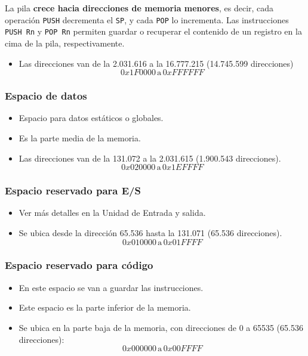 \documentclass{article}
\begin{document}
La pila \textbf{crece hacia direcciones de memoria menores}, es decir, cada operación \texttt{PUSH} decrementa el \texttt{SP}, y cada \texttt{POP} lo incrementa. Las instrucciones \texttt{PUSH Rn} y \texttt{POP Rn} permiten guardar o recuperar el contenido de un registro en la cima de la pila, respectivamente.

\begin{itemize}
  \item Las direcciones van de la 2.031.616 a la 16.777.215 (14.745.599 direcciones)
        \[
          0x1F0000 \, \text{a} \, 0xFFFFFF
        \]
\end{itemize}

\subsubsection{Espacio de datos}

\begin{itemize}
  \item Espacio para datos estáticos o globales.
  \item Es la parte media de la memoria.
  \item Las direcciones van de la 131.072 a la 2.031.615 (1.900.543 direcciones).
        \[
          0x020000 \, \text{a} \, 0x1EFFFF
        \]
\end{itemize}

\subsubsection{Espacio reservado para E/S}

\begin{itemize}
  \item Ver más detalles en la Unidad de Entrada y salida.
  \item Se ubica desde la dirección 65.536 hasta la 131.071 (65.536 direcciones).
        \[
          0x010000 \, \text{a} \, 0x01FFFF
        \]
\end{itemize}

\subsubsection{Espacio reservado para código}

\begin{itemize}
  \item En este espacio se van a guardar las instrucciones.
  \item Este espacio es la parte inferior de la memoria.
  \item Se ubica en la parte baja de la memoria, con direcciones de 0 a 65535 (65.536 direcciones):
        \[
          0x000000 \, \text{a} \, 0x00FFFF
        \]
\end{itemize}
\end{document}
